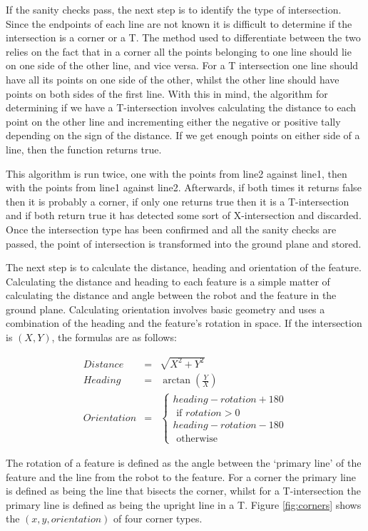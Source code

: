 \documentclass{article}
\begin{document}
If the sanity checks pass, the next step is to identify the type of intersection. Since the endpoints of each line are not known it is difficult to determine if the intersection is a corner or a T. The method used to differentiate between the two relies on the fact that in a corner all the points belonging to one line should lie on one side of the other line, and vice versa. For a T intersection one line should have all its points on one side of the other, whilst the other line should have points on both sides of the first line. With this in mind, the algorithm for determining if we have a T-intersection involves calculating the distance to each point on the other line and incrementing either the negative or positive tally depending on the sign of the distance. If we get enough points on either side of a line, then the function returns true.

This algorithm is run twice, one with the points from line2 against line1, then with the points from line1 against line2. Afterwards, if both times it returns false then it is probably a corner, if only one returns true then it is a T-intersection and if both return true it has detected some sort of X-intersection and discarded. Once the intersection type has been confirmed and all the sanity checks are passed, the point of intersection is transformed into the ground plane and stored.

The next step is to calculate the distance, heading and orientation of the feature. Calculating the distance and heading to each feature is a simple matter of calculating the distance and angle  between the robot and the feature in the ground plane. Calculating orientation involves basic geometry and uses a combination of the heading and the feature's rotation in space. If the intersection is $(X,Y)$, the formulas are as follows:

\begin{eqnarray}
Distance &=& \sqrt{X^2 + Y^2}\\
Heading &=& \arctan{(\frac{Y}{X})}\\
Orientation &=& \left\{ \begin{array}{rl}
heading - rotation + 180\\ \mbox{ if $rotation > 0$} \\
heading - rotation - 180\\ \mbox{ otherwise}
\end{array} \right.
\end{eqnarray}

The rotation of a feature is defined as the angle between the `primary line' of the feature and the line from the robot to the feature. For a corner the primary line is defined as being the line that bisects the corner, whilst for a T-intersection the primary line is defined as being the upright line in a T. Figure \ref{fig:corners} shows the $(x, y, orientation)$ of four corner types.
\end{document}
